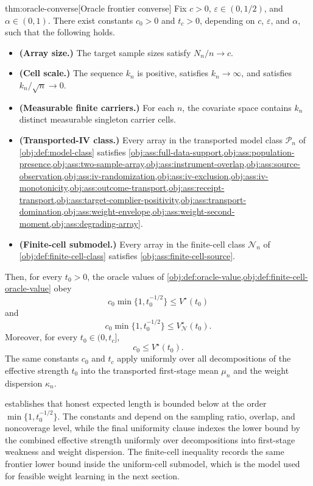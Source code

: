 \begin{theoremv}{thm:oracle-converse}[Oracle frontier converse]
Fix \(c>0\), \(\varepsilon\in(0,1/2)\), and \(\alpha\in(0,1)\).  There exist constants \(c_0>0\) and \(t_c>0\), depending on \(c\), \(\varepsilon\), and \(\alpha\), such that the following holds.

\begin{itemize}
\item \textbf{(Array size.)} The target sample sizes satisfy \(N_n/n\to c\).
\item \textbf{(Cell scale.)} The sequence \(k_n\) is positive, satisfies \(k_n\to\infty\), and satisfies \(k_n/\sqrt n\to0\).
\item \textbf{(Measurable finite carriers.)} For each \(n\), the covariate space contains \(k_n\) distinct measurable singleton carrier cells.
\item \textbf{(Transported-IV class.)} Every array in the transported model class \(\mathcal P_n\) of \cref{obj:def:model-class} satisfies \cref{obj:ass:full-data-support,obj:ass:population-presence,obj:ass:two-sample-array,obj:ass:instrument-overlap,obj:ass:source-observation,obj:ass:iv-randomization,obj:ass:iv-exclusion,obj:ass:iv-monotonicity,obj:ass:outcome-transport,obj:ass:receipt-transport,obj:ass:target-complier-positivity,obj:ass:transport-domination,obj:ass:weight-envelope,obj:ass:weight-second-moment,obj:ass:degrading-array}.
\item \textbf{(Finite-cell submodel.)} Every array in the finite-cell class \(\mathcal N_n\) of \cref{obj:def:finite-cell-class} satisfies \cref{obj:ass:finite-cell-source}.
\end{itemize}

Then, for every \(t_0>0\), the oracle values of \cref{obj:def:oracle-value,obj:def:finite-cell-oracle-value} obey
\[
c_0\min\{1,t_0^{-1/2}\}\le V^\star(t_0)
\]
and
\[
c_0\min\{1,t_0^{-1/2}\}\le V_{\mathcal N}^\star(t_0).
\]
Moreover, for every \(t_0\in(0,t_c]\),
\[
c_0\le V^\star(t_0).
\]
The same constants \(c_0\) and \(t_c\) apply uniformly over all decompositions of the effective strength \(t_0\) into the transported first-stage mean \(\mu_n\) and the weight dispersion \(\kappa_n\).
\end{theoremv}

 establishes that honest expected length is bounded below at the order \(\min\{1,t_0^{-1/2}\}\).  The constants  and  depend on the sampling ratio, overlap, and noncoverage level, while the final uniformity clause indexes the lower bound by the combined effective strength uniformly over decompositions into first-stage weakness and weight dispersion.  The finite-cell inequality records the same frontier lower bound inside the uniform-cell submodel, which is the model used for feasible weight learning in the next section.

